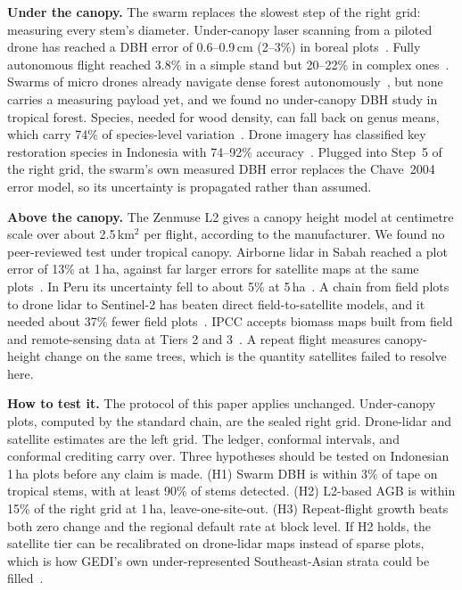 \documentclass[conference,a4paper]{IEEEtran}
\begin{document}
\textbf{Under the canopy.} The swarm replaces the slowest step of the right grid: measuring every stem's diameter. Under-canopy laser scanning from a piloted drone has reached a DBH error of 0.6--0.9\,cm (2--3\%) in boreal plots~\cite{hyyppa2020under}. Fully autonomous flight reached 3.8\% in a simple stand but 20--22\% in complex ones~\cite{liang2024forest}. Swarms of micro drones already navigate dense forest autonomously~\cite{zhou2022swarm}, but none carries a measuring payload yet, and we found no under-canopy DBH study in tropical forest. Species, needed for wood density, can fall back on genus means, which carry 74\% of species-level variation~\cite{chave2006regional}. Drone imagery has classified key restoration species in Indonesia with 74--92\% accuracy~\cite{williams2022monitoring}. Plugged into Step~5 of the right grid, the swarm's own measured DBH error replaces the Chave~2004 error model, so its uncertainty is propagated rather than assumed.

\textbf{Above the canopy.} The Zenmuse L2 gives a canopy height model at centimetre scale over about 2.5\,km$^2$ per flight, according to the manufacturer. We found no peer-reviewed test under tropical canopy. Airborne lidar in Sabah reached a plot error of 13\% at 1\,ha, against far larger errors for satellite maps at the same plots~\cite{jucker2018estimating}. In Peru its uncertainty fell to about 5\% at 5\,ha~\cite{asner2010high}. A chain from field plots to drone lidar to Sentinel-2 has beaten direct field-to-satellite models, and it needed about 37\% fewer field plots~\cite{wang2020estimating}. IPCC accepts biomass maps built from field and remote-sensing data at Tiers 2 and 3~\cite{ipcc2019v4ch2}. A repeat flight measures canopy-height change on the same trees, which is the quantity satellites failed to resolve here.

\textbf{How to test it.} The protocol of this paper applies unchanged. Under-canopy plots, computed by the standard chain, are the sealed right grid. Drone-lidar and satellite estimates are the left grid. The ledger, conformal intervals, and conformal crediting carry over. Three hypotheses should be tested on Indonesian 1\,ha plots before any claim is made. (H1) Swarm DBH is within 3\% of tape on tropical stems, with at least 90\% of stems detected. (H2) L2-based AGB is within 15\% of the right grid at 1\,ha, leave-one-site-out. (H3) Repeat-flight growth beats both zero change and the regional default rate at block level. If H2 holds, the satellite tier can be recalibrated on drone-lidar maps instead of sparse plots, which is how GEDI's own under-represented Southeast-Asian strata could be filled~\cite{duncanson2022gedi}.
\end{document}
